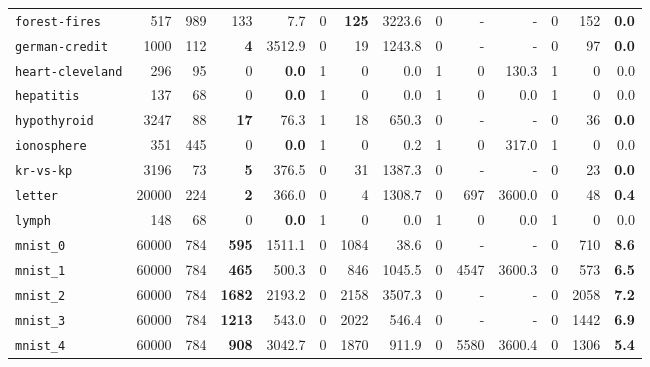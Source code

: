 \begin{tabular}{lccrrrrrrrrrrr}
\texttt{forest-fires} & \multicolumn{1}{r}{517} & \multicolumn{1}{r}{989}  & 133 & 7.7 & 0 & \textbf{125} & 3223.6 & 0 & - & - & 0 & 152 & \textbf{0.0}\\
\texttt{german-credit} & \multicolumn{1}{r}{1000} & \multicolumn{1}{r}{112}  & \textbf{4} & 3512.9 & 0 & 19 & 1243.8 & 0 & - & - & 0 & 97 & \textbf{0.0}\\
\texttt{heart-cleveland} & \multicolumn{1}{r}{296} & \multicolumn{1}{r}{95}  & 0 & \textbf{0.0} & 1 & 0 & 0.0 & 1 & 0 & 130.3 & 1 & 0 & 0.0\\
\texttt{hepatitis} & \multicolumn{1}{r}{137} & \multicolumn{1}{r}{68}  & 0 & \textbf{0.0} & 1 & 0 & 0.0 & 1 & 0 & 0.0 & 1 & 0 & 0.0\\
\texttt{hypothyroid} & \multicolumn{1}{r}{3247} & \multicolumn{1}{r}{88}  & \textbf{17} & 76.3 & 1 & 18 & 650.3 & 0 & - & - & 0 & 36 & \textbf{0.0}\\
\texttt{ionosphere} & \multicolumn{1}{r}{351} & \multicolumn{1}{r}{445}  & 0 & \textbf{0.0} & 1 & 0 & 0.2 & 1 & 0 & 317.0 & 1 & 0 & 0.0\\
\texttt{kr-vs-kp} & \multicolumn{1}{r}{3196} & \multicolumn{1}{r}{73}  & \textbf{5} & 376.5 & 0 & 31 & 1387.3 & 0 & - & - & 0 & 23 & \textbf{0.0}\\
\texttt{letter} & \multicolumn{1}{r}{20000} & \multicolumn{1}{r}{224}  & \textbf{2} & 366.0 & 0 & 4 & 1308.7 & 0 & 697 & 3600.0 & 0 & 48 & \textbf{0.4}\\
\texttt{lymph} & \multicolumn{1}{r}{148} & \multicolumn{1}{r}{68}  & 0 & \textbf{0.0} & 1 & 0 & 0.0 & 1 & 0 & 0.0 & 1 & 0 & 0.0\\
\texttt{mnist\_0} & \multicolumn{1}{r}{60000} & \multicolumn{1}{r}{784}  & \textbf{595} & 1511.1 & 0 & 1084 & 38.6 & 0 & - & - & 0 & 710 & \textbf{8.6}\\
\texttt{mnist\_1} & \multicolumn{1}{r}{60000} & \multicolumn{1}{r}{784}  & \textbf{465} & 500.3 & 0 & 846 & 1045.5 & 0 & 4547 & 3600.3 & 0 & 573 & \textbf{6.5}\\
\texttt{mnist\_2} & \multicolumn{1}{r}{60000} & \multicolumn{1}{r}{784}  & \textbf{1682} & 2193.2 & 0 & 2158 & 3507.3 & 0 & - & - & 0 & 2058 & \textbf{7.2}\\
\texttt{mnist\_3} & \multicolumn{1}{r}{60000} & \multicolumn{1}{r}{784}  & \textbf{1213} & 543.0 & 0 & 2022 & 546.4 & 0 & - & - & 0 & 1442 & \textbf{6.9}\\
\texttt{mnist\_4} & \multicolumn{1}{r}{60000} & \multicolumn{1}{r}{784}  & \textbf{908} & 3042.7 & 0 & 1870 & 911.9 & 0 & 5580 & 3600.4 & 0 & 1306 & \textbf{5.4}\\

\end{tabular}
